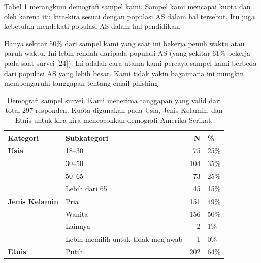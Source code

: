 \documentclass[lettersize,journal]{IEEEtran}
\begin{document}
Tabel 1 merangkum demografi sampel kami. Sampel kami mencapai kuota dan oleh
karena itu kira-kira sesuai dengan populasi AS dalam hal tersebut. Itu juga
kebetulan mendekati populasi AS dalam hal pendidikan.

Hanya sekitar 50\% dari sampel kami yang saat ini bekerja penuh waktu atau
paruh waktu. Ini lebih rendah daripada populasi AS (yang sekitar 61\% bekerja
pada saat survei [24]). Ini adalah cara utama kami percaya sampel kami berbeda
dari populasi AS yang lebih besar. Kami tidak yakin bagaimana ini mungkin
mempengaruhi tanggapan tentang email phishing.

\begin{table}[h!]
  \centering
  \caption{Demografi sampel survei. Kami menerima tanggapan yang valid dari total 297 responden. Kuota digunakan pada Usia, Jenis Kelamin, dan Etnis untuk kira-kira mencocokkan demografi Amerika Serikat.}
  \begin{tabular}{@{}llrl@{}}
    \toprule
    \textbf{Kategori}                              & \textbf{Subkategori}                     & \textbf{N} & \textbf{\%} \\ \midrule
    \textbf{Usia}                                  & 18--30                                   & 75         & 25\%        \\
                                                   & 30--50                                   & 104        & 35\%        \\
                                                   & 50--65                                   & 73         & 25\%        \\
                                                   & Lebih dari 65                            & 45         & 15\%        \\ \midrule
    \textbf{Jenis Kelamin}                         & Pria                                     & 151        & 49\%        \\
                                                   & Wanita                                   & 156        & 50\%        \\
                                                   & Lainnya                                  & 2          & 1\%         \\
                                                   & Lebih memilih untuk tidak menjawab       & 1          & 0\%         \\ \midrule
    \textbf{Etnis}                                 & Putih                                    & 202        & 64\%        \\

\end{tabular}
\end{table}
\end{document}
